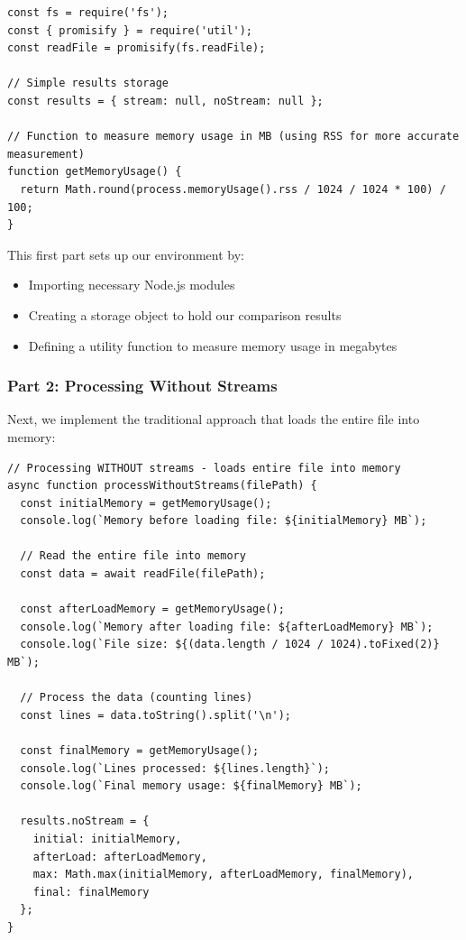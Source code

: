 \documentclass[12pt,letterpaper]{article}
\newenvironment{macterminal}{%
    \begin{mdframed}[
        linecolor=terminalFrame,
        backgroundcolor=terminalBg,
        roundcorner=5pt,
        skipabove=5pt,
        skipbelow=5pt,
        linewidth=1pt,
        innertopmargin=5pt,
        frametitle={%
            \tikz[baseline=(current bounding box.east), outer sep=0pt]{
                \fill[red!80!black] (0,0) circle (5pt);
                \fill[yellow!80!black] (0.7,0) circle (5pt);
                \fill[green!70!black] (1.4,0) circle (5pt);
            }
        },
        frametitlealignment=\raggedright,
        frametitleaboveskip=8pt,
        frametitlebelowskip=0pt,
    ]
}{%
    \end{mdframed}%
}
\begin{document}
\begin{macterminal}
\begin{lstlisting}
const fs = require('fs');
const { promisify } = require('util');
const readFile = promisify(fs.readFile);

// Simple results storage
const results = { stream: null, noStream: null };

// Function to measure memory usage in MB (using RSS for more accurate measurement)
function getMemoryUsage() {
  return Math.round(process.memoryUsage().rss / 1024 / 1024 * 100) / 100;
}
\end{lstlisting}
\end{macterminal}

This first part sets up our environment by:
\begin{itemize}
    \item Importing necessary Node.js modules
    \item Creating a storage object to hold our comparison results
    \item Defining a utility function to measure memory usage in megabytes
\end{itemize}

\subsubsection{Part 2: Processing Without Streams}

Next, we implement the traditional approach that loads the entire file into memory:

\begin{macterminal}
\begin{lstlisting}
// Processing WITHOUT streams - loads entire file into memory
async function processWithoutStreams(filePath) {
  const initialMemory = getMemoryUsage();
  console.log(`Memory before loading file: ${initialMemory} MB`);
  
  // Read the entire file into memory
  const data = await readFile(filePath);
  
  const afterLoadMemory = getMemoryUsage();
  console.log(`Memory after loading file: ${afterLoadMemory} MB`);
  console.log(`File size: ${(data.length / 1024 / 1024).toFixed(2)} MB`);
  
  // Process the data (counting lines)
  const lines = data.toString().split('\n');
  
  const finalMemory = getMemoryUsage();
  console.log(`Lines processed: ${lines.length}`);
  console.log(`Final memory usage: ${finalMemory} MB`);
  
  results.noStream = { 
    initial: initialMemory,
    afterLoad: afterLoadMemory,
    max: Math.max(initialMemory, afterLoadMemory, finalMemory), 
    final: finalMemory 
  };
}
\end{lstlisting}
\end{macterminal}
\end{document}
